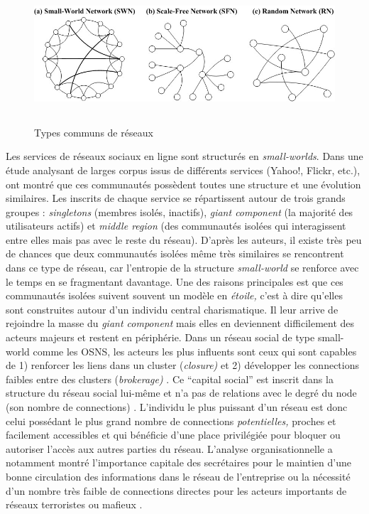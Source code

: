 \begin{figure}[htbp]
    \centering
    \includegraphics[width=6.3449in,height=2.0224in]{figures/chap3/chapitre3-img4.jpg}
    \caption{Types communs de réseaux}
\end{figure}

Les services de réseaux sociaux en ligne sont structurés en \textit{small-worlds}. Dans une étude analysant de larges corpus issus de différents services (Yahoo!, Flickr, etc.), \cite{Kumar2006} ont montré que ces communautés possèdent toutes une structure et une évolution similaires. Les inscrits de chaque service se répartissent autour de trois grands groupes : \textit{singletons} (membres isolés, inactifs), \textit{giant component} (la majorité des utilisateurs actifs) et \textit{middle region} (des communautés isolées qui interagissent entre elles mais pas avec le reste du réseau). D{\textquoteright}après les auteurs, il existe très peu de chances que deux communautés isolées m\^eme très similaires se rencontrent dans ce type de réseau, car l{\textquoteright}entropie de la structure \textit{small-world }se renforce avec le temps en se fragmentant davantage. Une des raisons principales est que ces communautés isolées suivent souvent un modèle en \textit{étoile, }c{\textquoteright}est à dire qu{\textquoteright}elles sont construites autour d{\textquoteright}un individu central charismatique. Il leur arrive de rejoindre la masse du \textit{giant component} mais elles en deviennent difficilement des acteurs majeurs et restent en périphérie. Dans un réseau social de type small-world comme les OSNS, les acteurs les plus influents sont ceux qui sont capables de 1) renforcer les liens dans un cluster (\textit{closure)} et 2) développer les connections faibles entre des clusters (\textit{brokerage)} \citep{Burt2008}. Ce {\textquotedblleft}capital social{\textquotedblright} est inscrit dans la structure du réseau social lui-m\^eme \citep{Lin1999} et n{\textquoteright}a pas de relations avec le degré du node (son nombre de connections) \citep{Cha2010}. L{\textquoteright}individu le plus puissant d{\textquoteright}un réseau est donc celui possédant le plus grand nombre de connections \textit{potentielles, }proches et facilement accessibles et qui bénéficie d{\textquoteright}une place privilégiée pour bloquer ou autoriser l{\textquoteright}accès aux autres parties du réseau. L{\textquoteright}analyse organisationnelle a notamment montré l{\textquoteright}importance capitale des secrétaires pour le maintien d{\textquoteright}une bonne circulation des informations dans le réseau de l{\textquoteright}entreprise ou la nécessité d{\textquoteright}un nombre très faible de connections directes pour les acteurs importants de réseaux terroristes ou mafieux \citep{Russel2011}.


